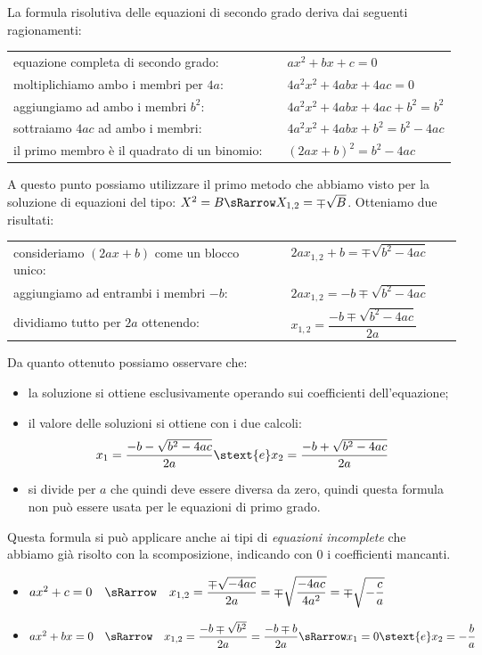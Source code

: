 La formula risolutiva delle equazioni di secondo grado deriva dai seguenti 
ragionamenti:
\begin{center}
\begin{tabular}{ll}
equazione completa di secondo grado: & \(ax^2 +b x +c=0\)\\
moltiplichiamo ambo i membri per \(4a\): & \(4a^2 x^2 +4 a b x +4 a c=0\)\\
aggiungiamo ad ambo i membri \(b^2\): & \(4a^2x^2 +4abx +4ac +b^2=b^2\)\\
sottraiamo \(4ac\) ad ambo i membri: & \(4a^2x^2 +4abx +b^2=b^2 -4ac\)\\
il primo membro è il quadrato di un binomio:~~ & \((2ax +b)^2=b^2 -4ac\)
\end{tabular}
\end{center}
A questo punto possiamo utilizzare il primo metodo che abbiamo visto per la 
soluzione di equazioni del tipo: 
\quad \(X^2=B \sRarrow X_{1,2}=\mp \sqrt{B}\). Otteniamo due risultati:
\begin{center}
\begin{tabular}{ll}
consideriamo \((2ax +b)\) come un blocco unico:~~ & 
    \(2ax_{1,2}+b=\mp \sqrt{b^2 -4ac}\) \quad ~~~\\
aggiungiamo ad entrambi i membri \(-b\): & 
    \(2ax_{1,2}=-b \mp \sqrt{b^2 -4ac}\)\\
dividiamo tutto per \(2a\) ottenendo: & 
    \(x_{1,2} = \dfrac{-b \mp \sqrt{b^2 -4ac}}{2a}\)
\end{tabular}
\end{center}

Da quanto ottenuto possiamo osservare che:
\begin{itemize} [noitemsep]
\item la soluzione si ottiene esclusivamente operando sui coefficienti
dell'equazione;
\item il valore delle soluzioni si ottiene con i due calcoli: 
\[x_1 = \dfrac{-b -\sqrt{b^{2} -4 ac}}{2 a} \stext{e} 
  x_2 = \dfrac{-b +\sqrt{b^{2} -4 ac}}{2 a}\]
\item si divide per \(a\) che quindi deve essere diversa da zero,
quindi questa formula non può essere usata per le equazioni di primo grado.
\end{itemize}

Questa formula si può applicare anche ai tipi di \emph{equazioni incomplete} 
che abbiamo già risolto con la scomposizione, indicando con \(0\) i 
coefficienti mancanti. 

\begin{itemize}
\item \(ax^2 +c=0 \quad \sRarrow \quad 
x_{1,2} = \dfrac{\mp \sqrt{-4ac}}{2a} = 
          \mp \sqrt{\dfrac{-4ac}{4a^2}} = \mp \sqrt{-\dfrac{c}{a}}\)
\item \(ax^2 +b x = 0 \quad \sRarrow \quad 
x_{1,2} = \dfrac{-b \mp \sqrt{b^2}}{2a} = 
          \dfrac{-b \mp b}{2a} \sRarrow 
x_1 = 0 \stext{e} x_2 = -\dfrac{b}{a}\) 
\end{itemize}

